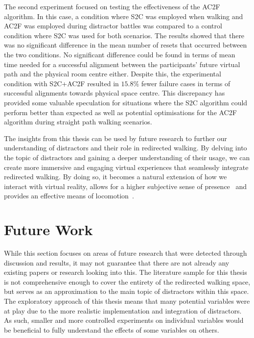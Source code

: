 The second experiment focused on testing the effectiveness of the AC2F algorithm. In this case, a condition where S2C was employed when walking and AC2F was employed during distractor battles was compared to a control condition where S2C was used for both scenarios. The results showed that there was no significant difference in the mean number of resets that occurred between the two conditions. No significant difference could be found in terms of mean time needed for a successful alignment between the participants' future virtual path and the physical room centre either. Despite this, the experimental condition with S2C+AC2F resulted in $15.8\%$ fewer failure cases in terms of successful alignments towards physical space centre. This discrepancy has provided some valuable speculation for situations where the S2C algorithm could perform better than expected as well as potential optimisations for the AC2F algorithm during straight path walking scenarios. 

The insights from this thesis can be used by future research to further our understanding of distractors and their role in redirected walking. By delving into the topic of distractors and gaining a deeper understanding of their usage, we can create more immersive and engaging virtual experiences that seamlessly integrate redirected walking. By doing so, it becomes a natural extension of how we interact with virtual reality, allows for a higher subjective sense of presence~\cite{peck2009evaluation, peck2011evaluation} and provides an effective means of locomotion~\cite{razzaque2001redirected, peck2011evaluation}.

\iffalse
   * This has provided insights for more predictive algorithms that it may not always be ideal to align towards centre. Depends whether they switch between algorithms or not though
\fi

\section{Future Work}\label{sec:futurework}
While this section focuses on areas of future research that were detected through discussion and results, it may not guarantee that there are not already any existing papers or research looking into this. The literature sample for this thesis is not comprehensive enough to cover the entirety of the redirected walking space, but serves as an approximation to the main topic of distractors within this space. The exploratory approach of this thesis means that many potential variables were at play due to the more realistic implementation and integration of distractors. As such, smaller and more controlled experiments on individual variables would be beneficial to fully understand the effects of some variables on others.

